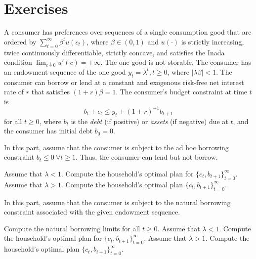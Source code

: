 \showchaptIDfalse
\showsectIDfalse
\section{Exercises}
\showchaptIDtrue
\showsectIDtrue
\medskip

 \quad
 A consumer has preferences over sequences of a single
consumption good that are ordered by
$\sum_{t=0}^\infty \beta^t u(c_t)$, where $\beta \in (0,1)$ and
$u(\cdot)$ is strictly increasing, twice continuously differentiable,
strictly concave, and satisfies the Inada condition
$\lim_{c \downarrow 0} u'(c) = +\infty$. The one good is not storable.
   The consumer
has an endowment sequence of the one good $y_t = \lambda^t, t \geq 0$,
where $|\lambda \beta | < 1$.    The consumer can borrow
or lend at a constant and exogenous risk-free net interest rate of
$r$ that satisfies $(1+r)\beta =1$.   The consumer's budget constraint
at time $t$ is
$$ b_t + c_t \leq y_t + (1+r)^{-1} b_{t+1} $$
for all $t \geq 0$, where $b_t$ is the {\it debt\/} (if positive) or
{\it assets\/} (if negative)  due at $t$,
and the consumer has initial debt $b_0=0$.

\medskip
{}  In this part, assume that the consumer is subject to
the ad hoc borrowing constraint $b_t \leq 0 \ \forall t \geq 1$.
Thus, the consumer can lend but not borrow.

\medskip
{}
Assume that $\lambda < 1$.  Compute the household's optimal plan for
$\{c_t,  b_{t+1}\}_{t=0}^\infty$.
\medskip
{}  Assume that $\lambda >1$.  Compute the household's optimal
plan
$\{c_t,  b_{t+1}\}_{t=0}^\infty$.


\medskip
{}
In this part, assume that the consumer is subject to
the natural borrowing constraint associated with the given endowment
sequence.


\medskip
{} Compute the natural borrowing limits for all
$t\geq 0$.
\medskip
{}
Assume that $\lambda < 1$.  Compute the household's optimal plan for
$\{c_t,  b_{t+1}\}_{t=0}^\infty$.
\medskip
{}  Assume that $\lambda >1$.  Compute the household's optimal
plan
$\{c_t,  b_{t+1}\}_{t=0}^\infty$.

